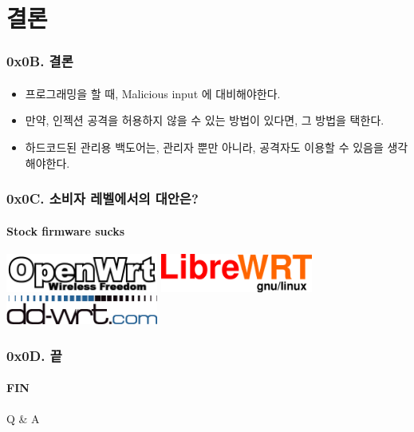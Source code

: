 \documentclass {beamer}
\begin{document}
\section[Section]{결론}
\begin{frame}
  \frametitle{0x0B. 결론}
  \framesubtitle{}

  \begin{itemize}
  \item<1->프로그래밍을 할 때, Malicious input 에 대비해야한다.
  \item<2->만약, 인젝션 공격을 허용하지 않을 수 있는 방법이 있다면, 그 방법을 택한다.
  \item<3->하드코드된 관리용 백도어는, 관리자 뿐만 아니라, 공격자도 이용할 수 있음을 생각해야한다.
  \end{itemize}
\end{frame}

\begin{frame}
  \frametitle{0x0C. 소비자 레벨에서의 대안은?}
  \framesubtitle{Stock firmware sucks}

  \begin{center}
    \includegraphics [width=50mm]{img/openwrt-logo.png}
    \linebreak
    \linebreak
    \includegraphics [width=50mm]{img/librewrt.png}
    \linebreak
    \linebreak
    \includegraphics [width=50mm]{img/dd-wrt-logo.png}
  \end{center}
\end{frame}

\begin{frame}
  \frametitle{0x0D. 끝}
  \framesubtitle{FIN}

  \begin{center}
    Q \& A
  \end{center}
\end{frame}
\end{document}
